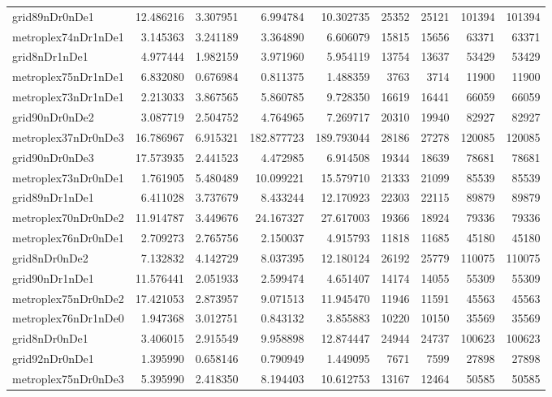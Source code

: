 \begin{longtable}{|l|r|r|r|r|r|r|r|r|}
grid89nDr0nDe1 & 12.486216 & 3.307951 & 6.994784 & 10.302735 & 25352 & 25121 & 101394 & 101394 \\
metroplex74nDr1nDe1 & 3.145363 & 3.241189 & 3.364890 & 6.606079 & 15815 & 15656 & 63371 & 63371 \\
grid8nDr1nDe1 & 4.977444 & 1.982159 & 3.971960 & 5.954119 & 13754 & 13637 & 53429 & 53429 \\
metroplex75nDr1nDe1 & 6.832080 & 0.676984 & 0.811375 & 1.488359 & 3763 & 3714 & 11900 & 11900 \\
metroplex73nDr1nDe1 & 2.213033 & 3.867565 & 5.860785 & 9.728350 & 16619 & 16441 & 66059 & 66059 \\
grid90nDr0nDe2 & 3.087719 & 2.504752 & 4.764965 & 7.269717 & 20310 & 19940 & 82927 & 82927 \\
metroplex37nDr0nDe3 & 16.786967 & 6.915321 & 182.877723 & 189.793044 & 28186 & 27278 & 120085 & 120085 \\
grid90nDr0nDe3 & 17.573935 & 2.441523 & 4.472985 & 6.914508 & 19344 & 18639 & 78681 & 78681 \\
metroplex73nDr0nDe1 & 1.761905 & 5.480489 & 10.099221 & 15.579710 & 21333 & 21099 & 85539 & 85539 \\
grid89nDr1nDe1 & 6.411028 & 3.737679 & 8.433244 & 12.170923 & 22303 & 22115 & 89879 & 89879 \\
metroplex70nDr0nDe2 & 11.914787 & 3.449676 & 24.167327 & 27.617003 & 19366 & 18924 & 79336 & 79336 \\
metroplex76nDr0nDe1 & 2.709273 & 2.765756 & 2.150037 & 4.915793 & 11818 & 11685 & 45180 & 45180 \\
grid8nDr0nDe2 & 7.132832 & 4.142729 & 8.037395 & 12.180124 & 26192 & 25779 & 110075 & 110075 \\
grid90nDr1nDe1 & 11.576441 & 2.051933 & 2.599474 & 4.651407 & 14174 & 14055 & 55309 & 55309 \\
metroplex75nDr0nDe2 & 17.421053 & 2.873957 & 9.071513 & 11.945470 & 11946 & 11591 & 45563 & 45563 \\
metroplex76nDr1nDe0 & 1.947368 & 3.012751 & 0.843132 & 3.855883 & 10220 & 10150 & 35569 & 35569 \\
grid8nDr0nDe1 & 3.406015 & 2.915549 & 9.958898 & 12.874447 & 24944 & 24737 & 100623 & 100623 \\
grid92nDr0nDe1 & 1.395990 & 0.658146 & 0.790949 & 1.449095 & 7671 & 7599 & 27898 & 27898 \\
metroplex75nDr0nDe3 & 5.395990 & 2.418350 & 8.194403 & 10.612753 & 13167 & 12464 & 50585 & 50585 \\

\end{longtable}

